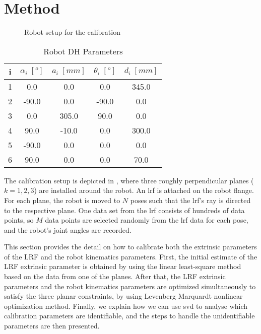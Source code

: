 \section{Method}
\label{sec:method}
\begin{figure}[t]
  \centering
  \vspace*{2mm}
  \caption{Robot setup for the calibration}
  \label{fig:robot_setup}
\end{figure}


\renewcommand{\arraystretch}{1.5}
\begin{table}[htp]
\caption{Robot DH Parameters}
\label{tab:dh_params}
\centering
\begin{tabular}{c c c c c}
\toprule
i &  \textbf{$\alpha_i \;[^o]$} & \textbf{$a_i \;[mm]$} &  \textbf{$\theta_i \;[^o]$}  & \textbf{$d_i \;[mm]$}\\
\midrule
1 & 0.0 & 0.0 & 0.0 & 345.0\\
2 & -90.0 & 0.0 & -90.0 & 0.0\\
3 & 0.0 & 305.0 & 90.0 & 0.0\\
4 & 90.0 & -10.0 & 0.0 & 300.0\\
5 & -90.0 & 0.0 & 0.0 & 0.0\\
6 & 90.0 & 0.0 & 0.0 & 70.0\\
\bottomrule
\end{tabular}
\end{table}

The calibration setup is depicted in , where three roughly perpendicular planes ($k=1,2,3$) are installed around the robot. An \ac{lrf} is attached on the robot flange. For each plane, the robot is moved to $N$ poses such that the \ac{lrf}'s ray is directed to the respective plane. One data set from the \ac{lrf} consists of hundreds of data points, so $M$ data points are selected randomly from the \ac{lrf} data for each pose, and the robot's joint angles are recorded. 

This section provides the detail on how to calibrate both the extrinsic parameters of the LRF and the robot kinematics parameters. First, the initial estimate of the LRF extrinsic parameter is obtained by using the linear least-square method based on the data from one of the planes. After that, the LRF extrinsic parameters and the robot kinematics parameters are optimized simultaneously to satisfy the three planar constraints, by using Levenberg Marquardt nonlinear optimization method. Finally, we explain how we can use \ac{svd} to analyse which calibration parameters are identifiable, and the steps to handle the unidentifiable parameters are then presented. 
